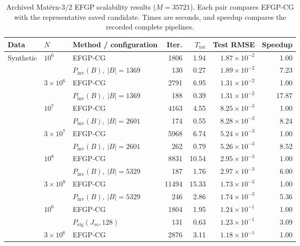 \begin{table}[H]
\centering
\footnotesize
\setlength{\tabcolsep}{3.5pt}
\caption{Archived Mat\'ern-\(3/2\) EFGP scalability results (\(M=35721\)). Each pair
compares EFGP-CG with the representative saved candidate. Times are
seconds, and speedup compares the recorded complete pipelines.}
\label{tab:matern-scalability}
\begin{tabular}{lllrrrr}
\toprule
Data & \(N\) & Method / configuration & Iter. &
\(T_{\mathrm{tot}}\) & Test RMSE & Speedup \\
\midrule
\multirow{12}{*}{Synthetic}
& \multirow{2}{*}{\(10^6\)} & EFGP-CG & 1806 & 1.94 & \(1.87{\times}10^{-2}\) & 1.00 \\
& & \(P_{\mathrm{inv}}(B),\ |B|=1369\) & 130 & 0.27 & \(1.89{\times}10^{-2}\) & 7.23 \\
& \multirow{2}{*}{\(3{\times}10^6\)} & EFGP-CG & 2791 & 6.95 & \(1.31{\times}10^{-2}\) & 1.00 \\
& & \(P_{\mathrm{inv}}(B),\ |B|=1369\) & 188 & 0.39 & \(1.31{\times}10^{-2}\) & 17.87 \\
& \multirow{2}{*}{\(10^7\)} & EFGP-CG & 4163 & 4.55 & \(8.25{\times}10^{-3}\) & 1.00 \\
& & \(P_{\mathrm{inv}}(B),\ |B|=2601\) & 174 & 0.55 & \(8.28{\times}10^{-3}\) & 8.24 \\
& \multirow{2}{*}{\(3{\times}10^7\)} & EFGP-CG & 5968 & 6.74 & \(5.24{\times}10^{-3}\) & 1.00 \\
& & \(P_{\mathrm{inv}}(B),\ |B|=2601\) & 262 & 0.79 & \(5.26{\times}10^{-3}\) & 8.52 \\
& \multirow{2}{*}{\(10^8\)} & EFGP-CG & 8831 & 10.54 & \(2.95{\times}10^{-3}\) & 1.00 \\
& & \(P_{\mathrm{inv}}(B),\ |B|=5329\) & 187 & 1.76 & \(2.97{\times}10^{-3}\) & 6.00 \\
& \multirow{2}{*}{\(3{\times}10^8\)} & EFGP-CG & 11494 & 15.33 & \(1.73{\times}10^{-3}\) & 1.00 \\
& & \(P_{\mathrm{inv}}(B),\ |B|=5329\) & 246 & 2.86 & \(1.74{\times}10^{-3}\) & 5.36 \\
\addlinespace[1pt]
\multirow{12}{*}{USGS}
& \multirow{2}{*}{\(10^6\)} & EFGP-CG & 1804 & 1.95 & \(1.24{\times}10^{-1}\) & 1.00 \\
& & \(P_{\mathrm{eig}}(J_m,128)\) & 131 & 0.63 & \(1.23{\times}10^{-1}\) & 3.09 \\
& \multirow{2}{*}{\(3{\times}10^6\)} & EFGP-CG & 2876 & 3.11 & \(1.18{\times}10^{-1}\) & 1.00 \\

\end{tabular}
\end{table}
